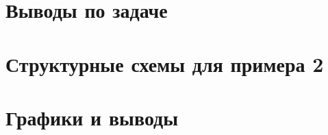 \documentclass[12pt]{article}
\begin{document}
	\newpage 
		\clearpage
	\section{Выводы по задаче}
	
	\newpage 
		\clearpage
	\section{Структурные схемы для примера 2}
	
	\newpage 
		\clearpage
	\section{Графики и выводы}
	
	\newpage 
		
\end{document}
